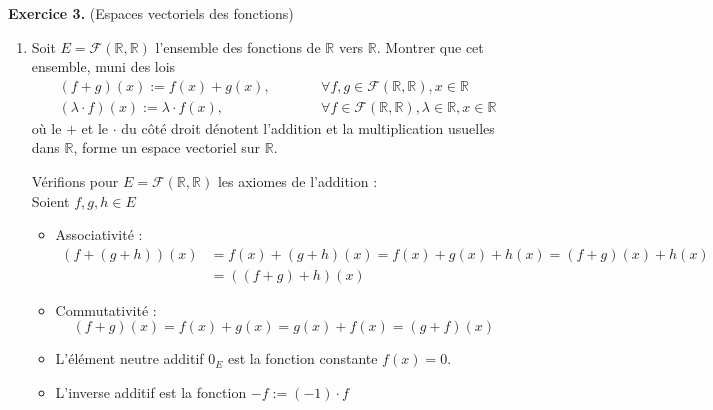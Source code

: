 \documentclass[a4paper, 10pt]{report}
\begin{document}
	\vspace{5mm}
	\noindent
	\textbf{Exercice 3.} (Espaces vectoriels des fonctions)
	
	\begin{enumerate}[label=\arabic*.]
		\item Soit $E = \mathcal{F}(\mathbb{R}, \mathbb{R})$
		l'ensemble des fonctions de $\mathbb{R}$ vers $\mathbb{R}$.
		Montrer que cet ensemble, muni des lois
		\[
			\begin{aligned}
				&(f + g)(x) := f(x) + g(x),
				\qquad
				& &\forall f, g \in \mathcal{F}(\mathbb{R}, \mathbb{R}),
				x \in \mathbb{R}\\
				&(\lambda \cdot f)(x) := \lambda \cdot f(x),
				\qquad
				& &\forall f \in \mathcal{F}(\mathbb{R}, \mathbb{R}),
				\lambda \in \mathbb{R}, x \in \mathbb{R}
			\end{aligned}
		\]
		où le $+$ et le $\cdot$ du côté droit dénotent l'addition
		et la multiplication usuelles dans $\mathbb{R}$, forme un
		espace vectoriel sur $\mathbb{R}$.
		
		\colorbox{solution}
		{
			\begin{minipage}{0.9\textwidth}
				Vérifions pour $E = \mathcal{F}(\mathbb{R}, \mathbb{R})$
				les axiomes de l'addition :\\
				Soient $f, g, h \in E$
				\begin{itemize}
					\item Associativité : 
						\[
							\begin{aligned}
								(f + (g + h))(x)
								&= f(x) + (g + h)(x)
								= f(x) + g(x) + h(x)
								= (f + g)(x) + h(x)\\
								&= ((f + g) + h)(x)
							\end{aligned}
						\]
					\item Commutativité :
						\[
							(f + g)(x)
							= f(x) + g(x)
							= g(x) + f(x)
							= (g + f)(x)
						\]
					\item L'élément neutre additif $0_E$ est la fonction
					constante $f(x) = 0$.
					\item L'inverse additif est la fonction
					$-f := (-1) \cdot f$
				\end{itemize}
				

\end{minipage}}
\end{enumerate}
\end{document}
